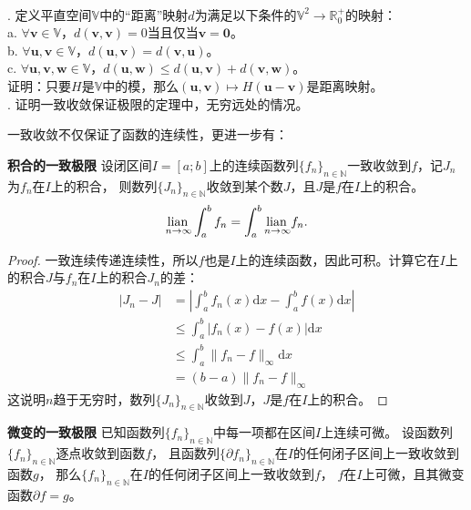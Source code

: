 \documentclass[12pt,UTF8,fontset=none]{ctexbook}
\begin{document}
\begin{appendix}
\begin{xt}
    \mbox{} \\
    . 定义平直空间$\mathbb{V}$中的“距离”映射$d$为满足以下条件的$\mathbb{V}^2 \rightarrow \mathbb{R}_0^+$的映射：\\
    \indent \indent a. $\forall \mathbf{v} \in \mathbb{V}$，$d(\mathbf{v}, \mathbf{v}) = 0$当且仅当$\mathbf{v} = \mathbf{0}$。\\
    \indent \indent b. $\forall \mathbf{u}, \mathbf{v} \in \mathbb{V}$，$d(\mathbf{u}, \mathbf{v}) = d(\mathbf{v}, \mathbf{u})$。\\
    \indent \indent c. $\forall \mathbf{u}, \mathbf{v}, \mathbf{w} \in \mathbb{V}$，$d(\mathbf{u}, \mathbf{w}) \leqslant d(\mathbf{u}, \mathbf{v}) + d(\mathbf{v}, \mathbf{w})$。\\
    \indent 证明：只要$H$是$\mathbb{V}$中的模，那么$(\mathbf{u}, \mathbf{v})\mapsto H(\mathbf{u} - \mathbf{v})$是距离映射。\\
    . 证明一致收敛保证极限的定理中，无穷远处的情况。
\end{xt}

一致收敛不仅保证了函数的连续性，更进一步有：

\begin{tm}{\textbf{积合的一致极限}}
    设闭区间$I=[a;b]$上的连续函数列$\{f_n\}_{n\in\mathbb{N}}$一致收敛到$f$，记$J_n$为$f_n$在$I$上的积合，
    则数列$\{J_n\}_{n\in\mathbb{N}}$收敛到某个数$J$，且$J$是$f$在$I$上的积合。
    $$ \underset{n\to \infty}{\operatorname{lian}\,} \int_a^b f_n = \int_a^b \underset{n\to\infty}{\operatorname{lian}\,} f_n. $$
\end{tm}

\begin{proof}
    一致连续传递连续性，所以$f$也是$I$上的连续函数，因此可积。计算它在$I$上的积合$J$与$f_n$在$I$上的积合$J_n$的差：
    \begin{align*}
        |J_n - J| &= \left|\int_a^b f_n(x)\mathrm{d}x - \int_a^b f(x)\mathrm{d}x \right| \\
        &\leqslant \int_a^b \left| f_n(x) - f(x)\right| \mathrm{d}x \\
        &\leqslant \int_a^b \| f_n - f\|_{\infty} \mathrm{d}x \\
        &= (b - a) \| f_n - f\|_{\infty}
    \end{align*}
    这说明$n$趋于无穷时，数列$\{J_n\}_{n\in\mathbb{N}}$收敛到$J$，$J$是$f$在$I$上的积合。

\end{proof}

\begin{tm}{\textbf{微变的一致极限}}
    已知函数列$\{f_n\}_{n\in\mathbb{N}}$中每一项都在区间$I$上连续可微。
    设函数列$\{f_n\}_{n\in\mathbb{N}}$逐点收敛到函数$f$，
    且函数列$\{\partial f_n\}_{n\in\mathbb{N}}$在$I$的任何闭子区间上一致收敛到函数$g$，
    那么$\{f_n\}_{n\in\mathbb{N}}$在$I$的任何闭子区间上一致收敛到$f$，
    $f$在$I$上可微，且其微变函数$\partial f = g$。


\end{tm}
\end{appendix}
\end{document}
